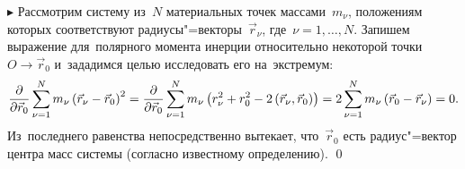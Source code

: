 \documentclass{weekly}
\begin{document}
$\blacktriangleright$ Рассмотрим систему из~$N$ материальных точек
массами~$m_\nu$, положениям которых соответствуют
радиусы"=векторы~$\vec r_\nu$, где~$\nu = 1, \ldots, N$.
Запишем выражение для~полярного момента инерции относительно
некоторой точки~$O \to \vec r_0$ и~зададимся целью исследовать его
на~экстремум:
\begin{equation}
    \frac{\partial }{\partial \vec r_0} \sum\limits_{\nu = 1}^{N} m_\nu
            \left( \vec r_\nu - \vec r_0 \right)^2
        = \frac{\partial }{\partial \vec r_0} \sum\limits_{\nu = 1}^{N} m_\nu
            \left( r_\nu^2 + r_0^2 -
            2\left(\vec r_\nu,\vec r_0\right) \right)
        = 2\sum\limits_{\nu = 1}^{N} m_\nu
            \left( \vec r_0 - \vec r_\nu \right) = 0.
\end{equation}
Из~последнего равенства непосредственно вытекает, что~$\vec r_0$
есть радиус"=вектор центра масс системы (согласно известному
определению). \qed
\end{document}
